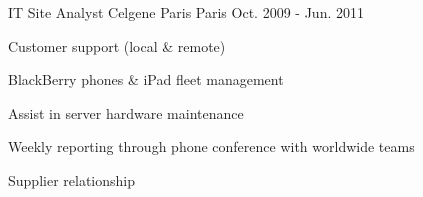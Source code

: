 \begin{cventries}
  \cventry
    {IT Site Analyst} %
    {Celgene Paris} %
    {Paris} %
    {Oct. 2009 - Jun. 2011} %
    {
      \begin{cvdoubleitems} %
        \item {Customer support (local \& remote)}
        \item {BlackBerry phones \& iPad fleet management}
        \item {Assist in server hardware maintenance}
        \item {Weekly reporting through phone conference with worldwide teams}
        \item {Supplier relationship}
      \end{cvdoubleitems}
    }

\end{cventries}
